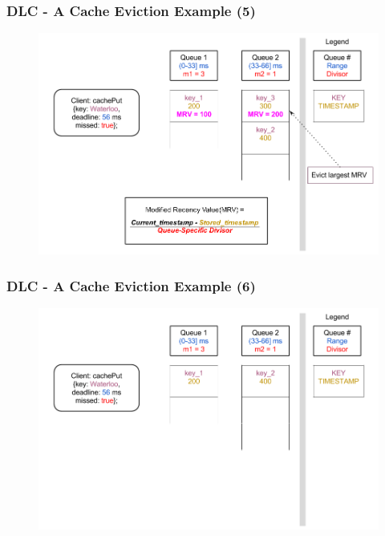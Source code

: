 \documentclass{beamer}
\begin{document}
\begin{frame}
  \frametitle{DLC - A Cache Eviction Example (5)}
  \begin{figure}
    \begin{center}
      \centerline{\includegraphics[scale=0.37]{img/DLC_V8_05.png}}
    \end{center}
  \end{figure}
\end{frame}

\begin{frame}
  \frametitle{DLC - A Cache Eviction Example (6)}
  \begin{figure}
    \begin{center}
      \centerline{\includegraphics[scale=0.37]{img/DLC_V8_06.png}}
    \end{center}
  \end{figure}
\end{frame}
\end{document}
